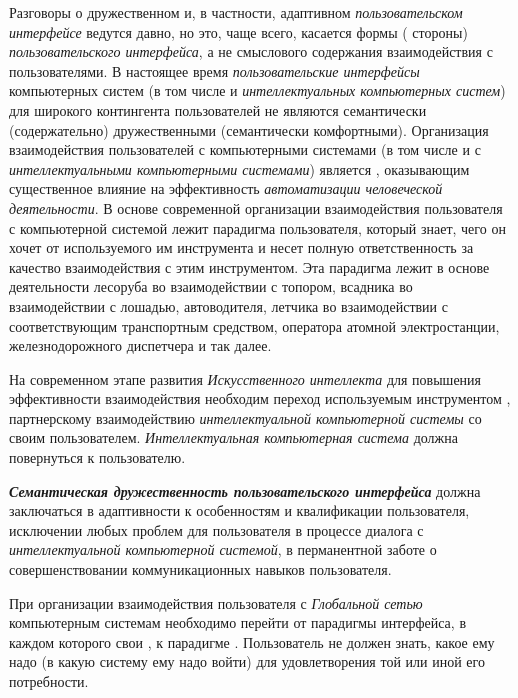 Разговоры о дружественном и, в частности, адаптивном \textit{пользовательском интерфейсе} ведутся давно, но это, чаще всего, касается формы ( стороны) \textit{пользовательского интерфейса}, а не смыслового содержания взаимодействия с пользователями. В настоящее время \textit{пользовательские интерфейсы} компьютерных систем (в том числе и \textit{интеллектуальных компьютерных систем}) для широкого контингента пользователей не являются семантически (содержательно) дружественными (семантически комфортными). Организация взаимодействия пользователей с компьютерными системами (в том числе и с \textit{интеллектуальными компьютерными системами}) является , оказывающим существенное влияние на эффективность \textit{автоматизации человеческой деятельности}. В основе современной организации взаимодействия пользователя с компьютерной системой лежит парадигма  пользователя, который знает, чего он хочет от используемого им инструмента и несет полную ответственность за качество взаимодействия с этим инструментом. Эта парадигма лежит в основе деятельности лесоруба во взаимодействии с топором, всадника во взаимодействии с лошадью, автоводителя, летчика во взаимодействии с соответствующим транспортным средством, оператора атомной электростанции, железнодорожного диспетчера и так далее.

На современном этапе развития \textit{Искусственного интеллекта} для повышения эффективности взаимодействия необходим переход    используемым инструментом   , партнерскому взаимодействию \textit{интеллектуальной компьютерной системы} со своим пользователем. \textit{Интеллектуальная компьютерная система} должна повернуться  к пользователю.

\textbf{\textit{Семантическая дружественность пользовательского интерфейса}} должна заключаться в адаптивности к особенностям и квалификации пользователя, исключении любых проблем для пользователя в процессе диалога с \textit{интеллектуальной компьютерной системой}, в перманентной заботе о совершенствовании коммуникационных навыков пользователя.

При организации взаимодействия пользователя с \textit{Глобальной сетью} компьютерным системам необходимо перейти от парадигмы  интерфейса, в каждом  которого свои , к парадигме . Пользователь не должен знать, какое  ему надо  (в какую систему ему надо войти) для удовлетворения той или иной его потребности.


